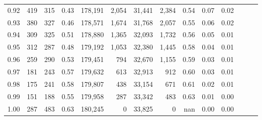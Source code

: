 \begin{tabular}{rrrrrrrrrrrrrr}
0.92 &    419 &  315 &  0.43 &  178,191 &    2,054 &  31,441 &   2,384 &  0.54 &  0.07 &      0.02 \\
0.93 &    380 &  327 &  0.46 &  178,571 &    1,674 &  31,768 &   2,057 &  0.55 &  0.06 &      0.02 \\
0.94 &    309 &  325 &  0.51 &  178,880 &    1,365 &  32,093 &   1,732 &  0.56 &  0.05 &      0.01 \\
0.95 &    312 &  287 &  0.48 &  179,192 &    1,053 &  32,380 &   1,445 &  0.58 &  0.04 &      0.01 \\
0.96 &    259 &  290 &  0.53 &  179,451 &      794 &  32,670 &   1,155 &  0.59 &  0.03 &      0.01 \\
0.97 &    181 &  243 &  0.57 &  179,632 &      613 &  32,913 &     912 &  0.60 &  0.03 &      0.01 \\
0.98 &    175 &  241 &  0.58 &  179,807 &      438 &  33,154 &     671 &  0.61 &  0.02 &      0.01 \\
0.99 &    151 &  188 &  0.55 &  179,958 &      287 &  33,342 &     483 &  0.63 &  0.01 &      0.00 \\
1.00 &    287 &  483 &  0.63 &  180,245 &        0 &  33,825 &       0 &   nan &  0.00 &      0.00 \\
\bottomrule
\end{tabular}
